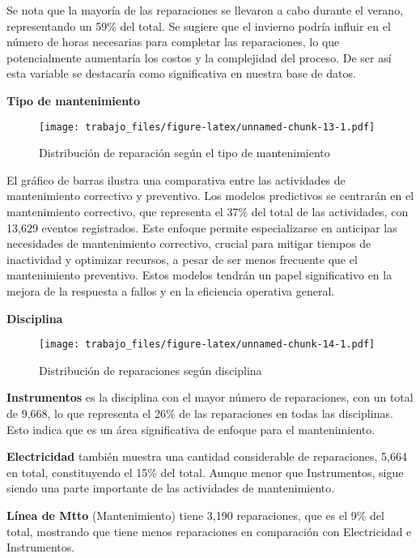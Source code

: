 \documentclass[
  11pt,
  bookmarksnumbered]{article}
\begin{document}
Se nota que la mayoría de las reparaciones se llevaron a cabo durante el verano, representando un 59\% del total.
Se sugiere que el invierno podría influir en el número de horas necesarias para completar las reparaciones, lo que potencialmente aumentaría los costos y la complejidad del proceso.
De ser así esta variable se destacaría como significativa en nuestra base de datos.

\newpage

\textbf{Tipo de mantenimiento}

\begin{figure}
\centering
\texttt{[image: trabajo\_files/figure-latex/unnamed-chunk-13-1.pdf]}
\caption{\label{fig:unnamed-chunk-13}Distribución de reparación según el tipo de mantenimiento}
\end{figure}

El gráfico de barras ilustra una comparativa entre las actividades de mantenimiento correctivo y preventivo.
Los modelos predictivos se centrarán en el mantenimiento correctivo, que representa el 37\% del total de las actividades, con 13,629 eventos registrados.
Este enfoque permite especializarse en anticipar las necesidades de mantenimiento correctivo, crucial para mitigar tiempos de inactividad y optimizar recursos, a pesar de ser menos frecuente que el mantenimiento preventivo.
Estos modelos tendrán un papel significativo en la mejora de la respuesta a fallos y en la eficiencia operativa general.

\newpage

\textbf{Disciplina}

\begin{figure}
\centering
\texttt{[image: trabajo\_files/figure-latex/unnamed-chunk-14-1.pdf]}
\caption{\label{fig:unnamed-chunk-14}Distribución de reparaciones según disciplina}
\end{figure}

\textbf{Instrumentos} es la disciplina con el mayor número de reparaciones, con un total de 9,668, lo que representa el 26\% de las reparaciones en todas las disciplinas.
Esto indica que es un área significativa de enfoque para el mantenimiento.

\textbf{Electricidad} también muestra una cantidad considerable de reparaciones, 5,664 en total, constituyendo el 15\% del total.
Aunque menor que Instrumentos, sigue siendo una parte importante de las actividades de mantenimiento.

\textbf{Línea de Mtto} (Mantenimiento) tiene 3,190 reparaciones, que es el 9\% del total, mostrando que tiene menos reparaciones en comparación con Electricidad e Instrumentos.
\end{document}
